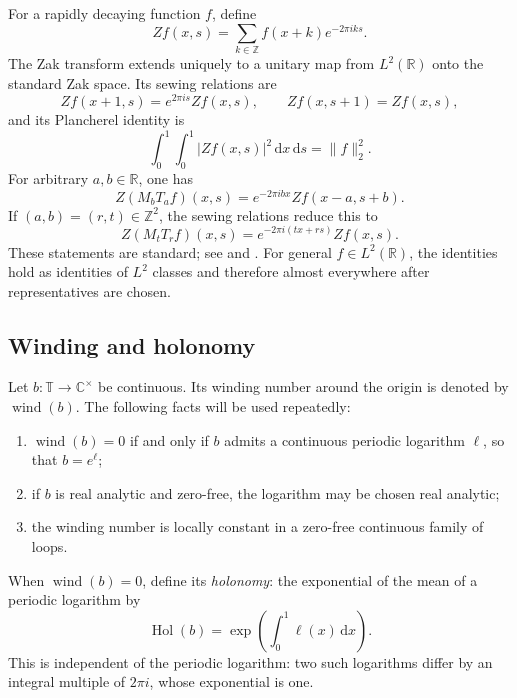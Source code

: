 \documentclass[reqno]{amsart}
\theoremstyle{remark}
\numberwithin{equation}{section}
\newcommand{\R}{\mathbb{R}}
\newcommand{\Z}{\mathbb{Z}}
\newcommand{\T}{\mathbb{T}}
\newcommand{\C}{\mathbb{C}}
\newcommand{\wind}{\operatorname{wind}}
\newcommand{\Hol}{\operatorname{Hol}}
\newcommand{\dd}{\,\mathrm{d}}
\begin{document}
For a rapidly decaying function \(f\), define
\[
  Zf(x,s)=\sum_{k\in\Z}f(x+k)e^{-2\pi i k s}.
\]
The Zak transform extends uniquely to a unitary map from \(L^2(\R)\) onto the
standard Zak space. Its sewing relations are
\begin{equation}
  Zf(x+1,s)=e^{2\pi i s}Zf(x,s),
  \qquad
  Zf(x,s+1)=Zf(x,s),
  \label{eq:zak-sewing}
\end{equation}
and its Plancherel identity is
\begin{equation}
  \int_0^1\int_0^1|Zf(x,s)|^2\dd x\dd s
  =\|f\|_2^2.
  \label{eq:zak-plancherel}
\end{equation}
For arbitrary \(a,b\in\R\), one has
\begin{equation}
  Z(M_bT_af)(x,s)
  =e^{-2\pi i b x}Zf(x-a,s+b).
  \label{eq:zak-general-covariance}
\end{equation}
If \((a,b)=(r,t)\in\Z^2\), the sewing relations reduce this to
\begin{equation}
  Z(M_tT_rf)(x,s)
  =e^{-2\pi i(tx+rs)}Zf(x,s).
  \label{eq:zak-integer-covariance}
\end{equation}
These statements are standard; see \cite[Chapters~7--8]{Grochenig} and
\cite[Chapter~1]{Folland}. For general \(f\in L^2(\R)\), the identities hold
as identities of \(L^2\) classes and therefore almost everywhere after
representatives are chosen.

\subsection{Winding and holonomy}

Let \(b:\T\to\C^\times\) be continuous. Its winding number around the origin
is denoted by \(\wind(b)\). The following facts will be used repeatedly:
\begin{enumerate}[label=(\roman*)]
  \item \(\wind(b)=0\) if and only if \(b\) admits a continuous periodic
  logarithm \(\ell\), so that \(b=e^\ell\);
  \item if \(b\) is real analytic and zero-free, the logarithm may be chosen
  real analytic;
  \item the winding number is locally constant in a zero-free continuous
  family of loops.
\end{enumerate}
When \(\wind(b)=0\), define its \emph{holonomy}: the exponential of the
mean of a periodic logarithm by
\begin{equation}
  \Hol(b)
  =\exp\left(\int_0^1\ell(x)\dd x\right).
  \label{eq:holonomy-def}
\end{equation}
This is independent of the periodic logarithm: two such logarithms differ by
an integral multiple of \(2\pi i\), whose exponential is one.
\end{document}
